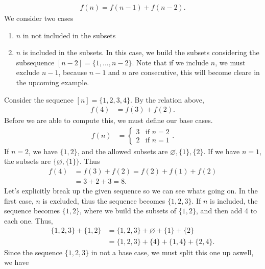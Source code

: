 \documentclass{report}
\begin{document}
\begin{itemize}
\begin{align*}
                f(n) = f(n-1) + f(n-2)
            .\end{align*}
            We consider two cases
            \begin{enumerate}
                \item $n$ in not included in the subsets
                \item $n$ is included in the subsets. In this case, we build the subsets considering the subsequence $[n-2]  = \{1,...,n-2\}$. Note that if we include $n$, we must exclude $n-1$, because $n-1$ and $n$ are consecutive, this will become cleare in the upcoming example.
            \end{enumerate}
            \bigbreak \noindent 
            Consider the sequence $[n] = \{1,2,3,4\}$. By the relation above, 
            \begin{align*}
                f(4) &= f(3) + f(2) 
            .\end{align*}
            Before we are able to compute this, we must define our base cases. 
            \begin{align*}
                f(n) &= \begin{cases}
                    3 & \text{if } n = 2 \\
                    2 & \text{if } n =1
                \end{cases}
            .\end{align*}
            If $n=2$, we have $\{1,2\}$, and the allowed subsets are $\varnothing, \{1\}, \{2\} $. If we have $n=1$, the subsets are $\{\varnothing, \{1\}\} $. Thus
            \begin{align*}
                f(4) &= f(3) + f(2) = f(2) + f(1) + f(2)  \\
                     &= 3 + 2 + 3 = 8               
            .\end{align*}
            Let's explicitly break up the given sequence so we can see whats going on. In the first case, $n$ is excluded, thus the sequence becomes $\{1,2,3\}$. If $n$ is included, the sequence becomes $\{1,2\}$, where we build the subsets of $\{1,2\}$, and then add 4 to each one. Thus,
            \begin{align*}
                \{1,2,3\} + \{1,2\} &= \{1,2,3\}  + \varnothing + \{1\} + \{2\} \\
                                    &= \{1,2,3\} + \{4\} + \{1,4\} + \{2,4\}
            .\end{align*}
            Since the sequence $\{1,2,3\}$ in not a base case, we must split this one up aswell, we have

\end{itemize}
\end{document}
